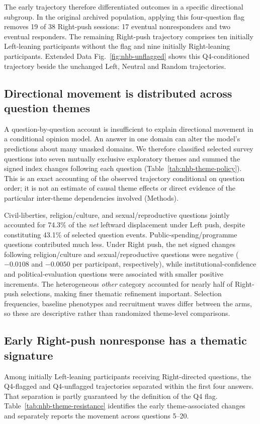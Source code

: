 \documentclass[11pt]{article}
\begin{document}
The early trajectory therefore differentiated outcomes in a specific directional subgroup. In the original archived population, applying this four-question flag removes 19 of 38 Right-push sessions: 17 eventual nonresponders and two eventual responders. The remaining Right-push trajectory comprises ten initially Left-leaning participants without the flag and nine initially Right-leaning participants. Extended Data Fig.~\ref{fig:nhb-unflagged} shows this Q4-conditioned trajectory beside the unchanged Left, Neutral and Random trajectories.

\subsection*{Directional movement is distributed across question themes}
A question-by-question account is insufficient to explain directional movement in a conditional opinion model. An answer in one domain can alter the model's predictions about many unasked domains. We therefore classified selected survey questions into seven mutually exclusive exploratory themes and summed the signed index changes following each question (Table~\ref{tab:nhb-theme-policy}). This is an exact accounting of the observed trajectory conditional on question order; it is not an estimate of causal theme effects or direct evidence of the particular inter-theme dependencies involved (Methods).



Civil-liberties, religion/culture, and sexual/reproductive questions jointly accounted for 74.3\% of the \emph{net} leftward displacement under Left push, despite constituting 43.1\% of selected question events. Public-spending/programme questions contributed much less. Under Right push, the net signed changes following religion/culture and sexual/reproductive questions were negative ($-0.0108$ and $-0.0050$ per participant, respectively), while institutional-confidence and political-evaluation questions were associated with smaller positive increments. The heterogeneous \emph{other} category accounted for nearly half of Right-push selections, making finer thematic refinement important. Selection frequencies, baseline phenotypes and recruitment waves differ between the arms, so these are descriptive rather than randomized theme-level comparisons.

\subsection*{Early Right-push nonresponse has a thematic signature}
Among initially Left-leaning participants receiving Right-directed questions, the Q4-flagged and Q4-unflagged trajectories separated within the first four answers. That separation is partly guaranteed by the definition of the Q4 flag. Table~\ref{tab:nhb-theme-resistance} identifies the early theme-associated changes and separately reports the movement across questions 5--20.
\end{document}
